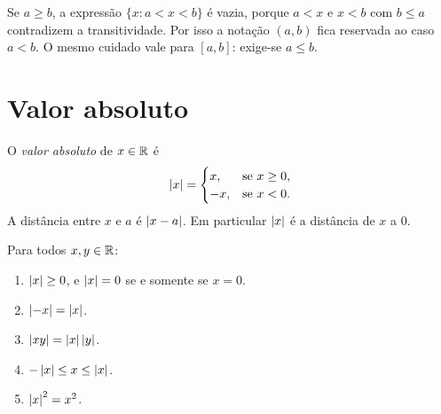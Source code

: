 \documentclass[11pt,a4paper]{article}
\begin{document}
\begin{observacao}
Se $a\ge b$, a expressão $\{x:a<x<b\}$ é vazia, porque $a<x$ e $x<b$ com $b\le a$ contradizem a transitividade. Por isso a notação $(a,b)$ fica reservada ao caso $a<b$. O mesmo cuidado vale para $[a,b]$: exige-se $a\le b$.
\end{observacao}

\section{Valor absoluto}

\begin{definicao}
O \emph{valor absoluto} de $x\in\mathbb{R}$ é
\[
\left\lvert x \right\rvert=
\begin{cases}
x,&\text{se }x\ge 0,\\
-x,&\text{se }x<0.
\end{cases}
\]
A distância entre $x$ e $a$ é $\left\lvert x-a \right\rvert$. Em particular $\left\lvert x \right\rvert$ é a distância de $x$ a $0$.
\end{definicao}

\begin{proposicao}\label{prop:mod-basico}
Para todos $x,y\in\mathbb{R}$:
\begin{enumerate}
\item $\left\lvert x \right\rvert\ge 0$, e $\left\lvert x \right\rvert=0$ se e somente se $x=0$.
\item $\left\lvert -x \right\rvert=\left\lvert x \right\rvert$.
\item $\left\lvert xy \right\rvert=\left\lvert x \right\rvert\left\lvert y \right\rvert$.
\item $-\left\lvert x \right\rvert\le x\le\left\lvert x \right\rvert$.
\item $\left\lvert x \right\rvert^2=x^2$.
\end{enumerate}
\end{proposicao}
\end{document}
